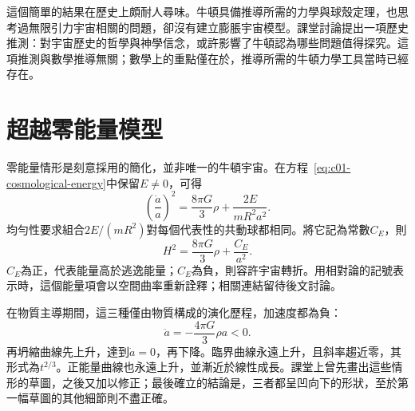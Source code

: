 \begin{classroomqa}
\end{classroomqa}

這個簡單的結果在歷史上頗耐人尋味。牛頓具備推導所需的力學與球殼定理，也思考過無限引力宇宙相關的問題，卻沒有建立膨脹宇宙模型。課堂討論提出一項歷史推測：對宇宙歷史的哲學與神學信念，或許影響了牛頓認為哪些問題值得探究。這項推測與數學推導無關；數學上的重點僅在於，推導所需的牛頓力學工具當時已經存在。

\begin{classroomqa}
\end{classroomqa}

\section{超越零能量模型}

零能量情形是刻意採用的簡化，並非唯一的牛頓宇宙。在方程~\eqref{eq:c01-cosmological-energy}中保留\(E\neq0\)，可得
\begin{equation}
\left(\frac{\dot a}{a}\right)^2
=\frac{8\pi G}{3}\rho+\frac{2E}{mR^2a^2}.
\label{eq:c01-nonzero-energy}
\end{equation}
均勻性要求組合\(2E/(mR^2)\)對每個代表性的共動球都相同。將它記為常數\(C_E\)，則
\begin{equation}
H^2=\frac{8\pi G}{3}\rho+\frac{C_E}{a^2}.
\end{equation}
\(C_E\)為正，代表能量高於逃逸能量；\(C_E\)為負，則容許宇宙轉折。用相對論的記號表示時，這個能量項會以空間曲率重新詮釋；相關連結留待後文討論。

在物質主導期間，這三種僅由物質構成的演化歷程，加速度都為負：
\begin{equation}
\ddot a=-\frac{4\pi G}{3}\rho a<0.
\end{equation}
再坍縮曲線先上升，達到\(\dot a=0\)，再下降。臨界曲線永遠上升，且斜率趨近零，其形式為\(t^{2/3}\)。正能量曲線也永遠上升，並漸近於線性成長。課堂上曾先畫出這些情形的草圖，之後又加以修正；最後確立的結論是，三者都呈凹向下的形狀，至於第一幅草圖的其他細節則不盡正確。

